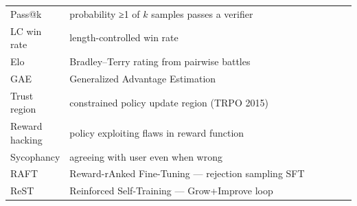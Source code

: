 \documentclass{article}
\begin{document}
\begin{table}[t]
\begin{tabular}{>{\raggedright\arraybackslash}p{0.1308\linewidth}
  >{\raggedright\arraybackslash}p{0.8692\linewidth}}
Pass@k & probability ≥1 of \(k\) samples passes a verifier \\
LC win rate & length-controlled win rate \citep{park2024disentanglinglengt} \\
Elo & Bradley--Terry rating from pairwise battles \\
GAE & Generalized Advantage Estimation \citep{schulman2016highdimensionalcon} \\
Trust region & constrained policy update region (TRPO 2015) \\
Reward hacking & policy exploiting flaws in reward function \\
Sycophancy & agreeing with user even when wrong \\
RAFT & Reward-rAnked Fine-Tuning --- rejection sampling SFT \citep{dong2023raftrewardrankedfi} \\
ReST & Reinforced Self-Training \citep{gulcehre20232023} --- Grow+Improve loop \\
\end{tabular}
\end{table}



\end{document}
